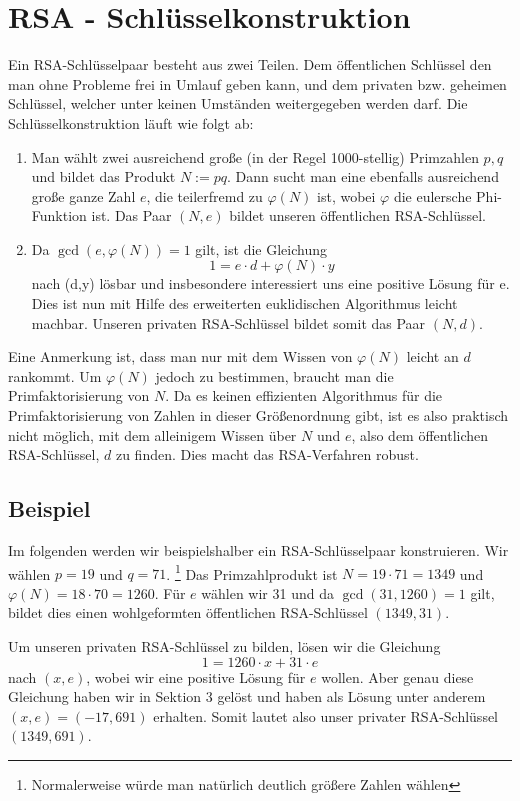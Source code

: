 \documentclass[11pt]{article}
\begin{document}
\section{RSA - Schl\"usselkonstruktion}
Ein RSA-Schl\"usselpaar besteht aus zwei Teilen. Dem \"offentlichen Schl\"ussel den man ohne Probleme frei in Umlauf geben kann,
und dem privaten bzw. geheimen Schl\"ussel, welcher unter keinen Umst\"anden weitergegeben werden darf. Die Schl\"usselkonstruktion
l\"auft wie folgt ab:
\begin{enumerate}
    \item 
        Man w\"ahlt zwei ausreichend gro{\ss}e (in der Regel 1000-stellig) Primzahlen $p,q$ und bildet das Produkt $N := pq$.
        Dann sucht man eine ebenfalls ausreichend gro{\ss}e ganze Zahl $e$, die teilerfremd zu $\varphi(N)$ ist, wobei $\varphi$ die eulersche 
        Phi-Funktion ist. Das Paar $(N,e)$ bildet unseren \"offentlichen RSA-Schl\"ussel.

    \item
        Da $\gcd(e,\varphi(N)) = 1$ gilt, ist die Gleichung \[ 1 = e \cdot d + \varphi(N) \cdot y \] nach (d,y) l\"osbar und insbesondere 
        interessiert uns eine positive L\"osung f\"ur e. Dies ist nun mit Hilfe des erweiterten euklidischen Algorithmus leicht machbar.
        Unseren privaten RSA-Schl\"ussel bildet somit das Paar $(N,d)$. 
\end{enumerate}
Eine Anmerkung ist, dass man nur mit dem Wissen von $\varphi(N)$ leicht an $d$ rankommt.
Um $\varphi(N)$ jedoch zu bestimmen, braucht man die Primfaktorisierung von $N$. Da es keinen effizienten Algorithmus f\"ur 
die Primfaktorisierung von Zahlen in dieser Gr\"o{\ss}enordnung gibt, ist es also praktisch nicht m\"oglich, mit dem alleinigem Wissen 
\"uber $N$ und $e$, also dem \"offentlichen RSA-Schl\"ussel, $d$ zu finden. Dies macht das RSA-Verfahren robust.

\subsection{Beispiel}
Im folgenden werden wir beispielshalber ein RSA-Schl\"usselpaar konstruieren. Wir w\"ahlen $p=19$ und $q=71$.
\footnote{Normalerweise w\"urde man nat\"urlich deutlich gr\"o{\ss}ere Zahlen w\"ahlen}
Das Primzahlprodukt ist $N=19\cdot71=1349$ und $\varphi(N) = 18 \cdot 70 = 1260$. F\"ur $e$ w\"ahlen wir 31 und 
da $\gcd(31,1260) = 1$ gilt, bildet dies einen wohlgeformten \"offentlichen RSA-Schl\"ussel $(1349,31)$.

Um unseren privaten RSA-Schl\"ussel zu bilden, l\"osen wir die Gleichung \[ 1 = 1260 \cdot x + 31 \cdot e \] nach $(x,e)$, wobei wir eine
positive L\"osung f\"ur $e$ wollen. Aber genau diese Gleichung haben wir in Sektion 3 gel\"ost und haben als L\"osung unter anderem 
$(x,e) = (-17,691)$ erhalten. Somit lautet also unser privater RSA-Schl\"ussel $(1349,691)$.
\end{document}
